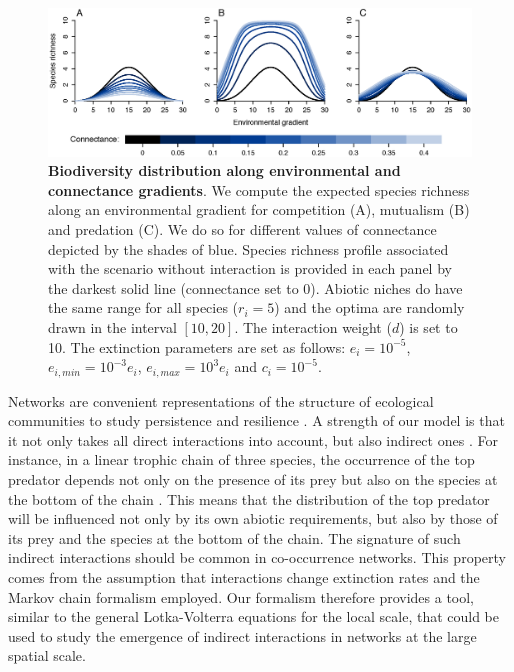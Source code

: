 \begin{figure}[h!]
\centering
\includegraphics [width=\textwidth]{./chapitre1/fig5.eps}
\caption[Biodiversity distribution along environmental and connectance gradients]{\textbf{Biodiversity distribution along environmental and connectance gradients}. We compute the expected species richness along an environmental gradient for competition (A), mutualism (B) and predation (C). We do so for different values of connectance depicted by the shades of blue. Species richness profile associated with the scenario without interaction is provided in each panel by the darkest solid line (connectance set to 0). Abiotic niches do have the same range for all species ($r_i=5$) and the optima are randomly drawn in the interval $[10,20]$. The interaction weight ($d$) is set to 10. The extinction parameters are set as follows: $e_i=10^{-5}$, $e_{i,min}=10^{-3}e_i$, $e_{i,max}=10^{3}e_i$ and $c_i=10^{-5}$.}
\label{chap1fig5}
\end{figure}

Networks are convenient representations of the structure of ecological communities to study persistence and resilience \citep{Thebault2010}. A strength of our model is that it not only takes all direct interactions into account, but also indirect ones \citep{Wootton1994}. For instance, in a linear trophic chain of three species, the occurrence of the top predator depends not only on the presence of its prey but also on the species at the bottom of the chain \citep{Gravel2011}. This means that the distribution of the top predator will be influenced not only by its own abiotic requirements, but also by those of its prey and the species at the bottom of the chain. The signature of such indirect interactions should be common in co-occurrence networks. This property comes from the assumption that interactions change extinction rates and the Markov chain formalism employed. Our formalism therefore provides a tool, similar to the general Lotka-Volterra equations for the local scale, that could be used to study the emergence of indirect interactions in networks at the large spatial scale.

